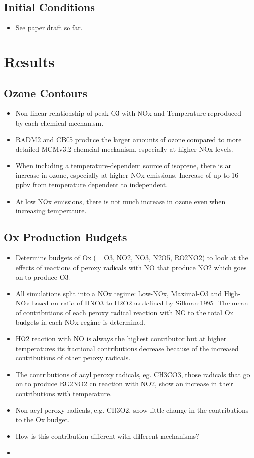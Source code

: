 \documentclass[11pt,a4paper]{article}
\begin{document}
\subsection{Initial Conditions}
\begin{itemize}
    \item See paper draft so far.
\end{itemize}

\section{Results} \label{s:results}
\subsection{Ozone Contours}
\begin{itemize}
    \item Non-linear relationship of peak O3 with NOx and Temperature reproduced by each chemical mechanism.
    \item RADM2 and CB05 produce the larger amounts of ozone compared to more detailed MCMv3.2 chemcial mechanism, especially at higher NOx levels.
    \item When including a temperature-dependent source of isoprene, there is an increase in ozone, especially at higher NOx emissions. Increase of up to 16 ppbv from temperature dependent to independent.
    \item At low NOx emissions, there is not much increase in ozone even when increasing temperature.
\end{itemize}

\subsection{Ox Production Budgets}
\begin{itemize}
    \item Determine budgets of  Ox (= O3, NO2, NO3, N2O5, RO2NO2) to look at the effects of reactions of peroxy radicals with NO that produce NO2 which goes on to produce O3.
    \item All simulations split into a NOx regime: Low-NOx, Maximal-O3 and High-NOx based on ratio of HNO3 to H2O2 as defined by Sillman:1995. The mean of contributions of each peroxy radical reaction with NO to the total Ox budgets in each NOx regime is determined.
    \item HO2 reaction with NO is always the highest contributor but at higher temperatures its fractional contributions decrease because of the increased contributions of other peroxy radicals.
    \item The contributions of acyl peroxy radicals, eg. CH3CO3, those radicals that go on to produce RO2NO2 on reaction with NO2, show an increase in their contributions with temperature.
    \item Non-acyl peroxy radicals, e.g. CH3O2, show little change in the contributions to the Ox budget.
    \item \color{red}How is this contribution different with different mechanisms?
    \item \color{red}{Quantitive results}
\end{itemize}
\end{document}
